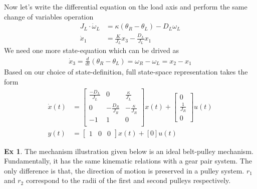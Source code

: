 \documentclass[twoside]{article}
\theoremstyle{definition}
\newtheorem{exmp}[theorem]{Ex}
\begin{document}
Now let's write the differential equation on the load axis and perform
the same change of variables operation 
%
\begin{align*}
J_L \cdot \dot{\omega}_L &= \kappa ( \theta_R - \theta_L) - D_L \omega_L
\\
\dot{x}_1 &= \frac{K}{J_L} x_3 - \frac{D_L}{J_L} x_1
\end{align*}    
%
We need one more state-equation which can be drived as
%
\begin{align*}
   \dot{x}_3 = \frac{d}{dt} \left( \theta_R - \theta_L \right) =
  \omega_R - \omega_L = x_2 - x_1
\end{align*}
%
Based on our choice of state-definition, full state-space
representation takes the form
%
\begin{align*}
\dot{x}(t) &= \left[ \begin{array}{ccc} \frac{-D_L}{J_L} & 0 & \frac{\kappa}{J_L}  \\
0 & -\frac{D_R}{J_R} & -\frac{\kappa}{J_R} 
\\
-1 & 1 & 0 \\
\end{array} \right] x(t) +
                   \left[ \begin{array}{c} 0 \\ \frac{1}{J_R} \\
                            0 \end{array} \right] u(t)
\\
y(t) &= \left[ \begin{array}{ccc} 1 & 0 & 0 \end{array} \right] x(t) +
                                          [0] u(t)
\end{align*}    


\vspace{6pt}

\begin{exmp}
The mechanism illustration given below is an ideal belt-pulley
mechanism. Fundamentally, it has the same
kinematic relations with a gear pair system. The only difference is that, the direction of motion is preserved
in a pulley system. $r_1$ and $r_2$ correspond to the radii of the
first and second pulleys respectively. 
\end{exmp}
  
\vspace{12pt}
  
\end{document}
